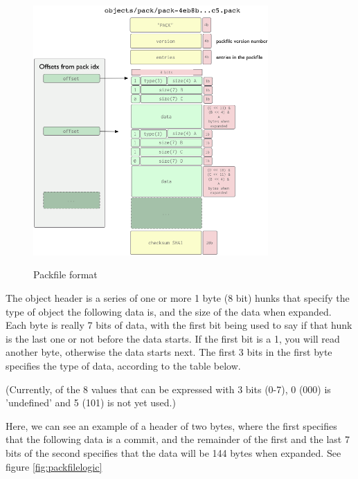 \begin{figure}[tbp]
\centering
\includegraphics[width=0.80\textwidth]{content/git/packfile-format.png}
\label{fig:packfileformat}
\caption{Packfile format}
\end{figure}

The object header is a series of one or more 1 byte (8 bit) hunks that specify
the type of object the following data is, and the size of the data when
expanded. Each byte is really 7 bits of data, with the first bit being used to
say if that hunk is the last one or not before the data starts. If the first
bit is a 1, you will read another byte, otherwise the data starts next. The
first 3 bits in the first byte specifies the type of data, according to the
table below.

(Currently, of the 8 values that can be expressed with 3 bits (0-7), 0 (000) is
'undefined' and 5 (101) is not yet used.)

Here, we can see an example of a header of two bytes, where the first specifies
that the following data is a commit, and the remainder of the first and the
last 7 bits of the second specifies that the data will be 144 bytes when
expanded. See figure \ref{fig:packfilelogic}

